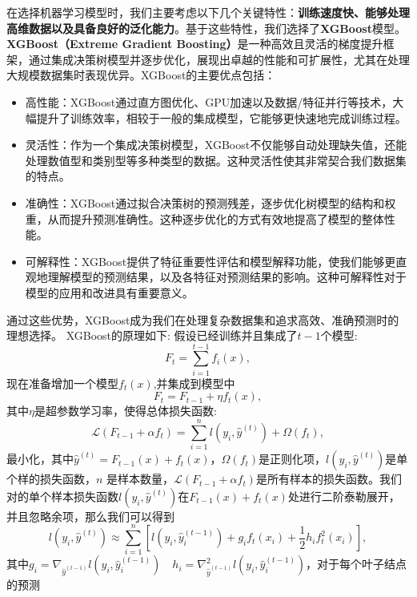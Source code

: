 在选择机器学习模型时，我们主要考虑以下几个关键特性：\textbf{训练速度快、能够处理高维数据以及具备良好的泛化能力}。基于这些特性，我们选择了\textbf{XGBoost}模型。\textbf{XGBoost（Extreme Gradient Boosting）}\cite{10.1145/2939672.2939785}是一种高效且灵活的梯度提升框架，通过集成决策树模型并逐步优化，展现出卓越的性能和可扩展性，尤其在处理大规模数据集时表现优异。XGBoost的主要优点包括：
\begin{itemize}
	\item 高性能：XGBoost通过直方图优化、GPU加速以及数据/特征并行等技术，大幅提升了训练效率，相较于一般的集成模型，它能够更快速地完成训练过程。
	\item 灵活性：作为一个集成决策树模型，XGBoost不仅能够自动处理缺失值，还能处理数值型和类别型等多种类型的数据。这种灵活性使其非常契合我们数据集的特点。
	\item 准确性：XGBoost通过拟合决策树的预测残差，逐步优化树模型的结构和权重，从而提升预测准确性。这种逐步优化的方式有效地提高了模型的整体性能。
	\item 可解释性：XGBoost提供了特征重要性评估和模型解释功能，使我们能够更直观地理解模型的预测结果，以及各特征对预测结果的影响。这种可解释性对于模型的应用和改进具有重要意义。
\end{itemize}
通过这些优势，XGBoost成为我们在处理复杂数据集和追求高效、准确预测时的理想选择。
XGBoost的原理如下:
假设已经训练并且集成了$t-1$个模型:
\begin{equation}
	F_t=\sum_{i=1}^{t-1}f_i(x),
\end{equation}
现在准备增加一个模型$f_t(x)$,并集成到模型中
\begin{equation}
	F_t=F_{t-1}+\eta f_t(x),
\end{equation}
其中$\eta$是超参数学习率，使得总体损失函数:
\begin{equation}
	\mathcal{L}(F_{t-1}+\alpha f_t)=\sum_{i=1}^{n}l(y_i,\hat{y}^{(t)})+\Omega(f_t),
\end{equation}
最小化，其中$\hat{y}^{(t)}=F_{t-1}(x)+f_t(x)$，$\Omega(f_t)$是正则化项，$l(y_i,\hat{y}^{(t)})$是单个样的损失函数，$n$ 是样本数量，$\mathcal{L}(F_{t-1}+\alpha f_t)$是所有样本的损失函数。我们对的单个样本损失函数$l(y_i,\hat{y}^{(t)})$在$F_{t-1}(x)+f_t(x)$处进行二阶泰勒展开，并且忽略余项，那么我们可以得到 \begin{equation}
	l(y_i,\hat{y}^{(t)})\approx\sum_{i=1}^{n}\left[l\left(y_{i},\hat{y}_{i}^{(t-1)}\right)+g_{i}f_{t}(x_{i})+\frac{1}{2}h_{i}f_{t}^{2}(x_{i})\right],
\end{equation}
其中$g_i=\nabla_{\hat{y}^{(t-1)}}l\left(y_i,\hat{y}_i^{(t-1)}\right)\quad h_i=\nabla_{\hat{y}^{(t-1)}}^2l\left(y_i,\hat{y}_i^{(t-1)}\right)$，对于每个叶子结点的预测

